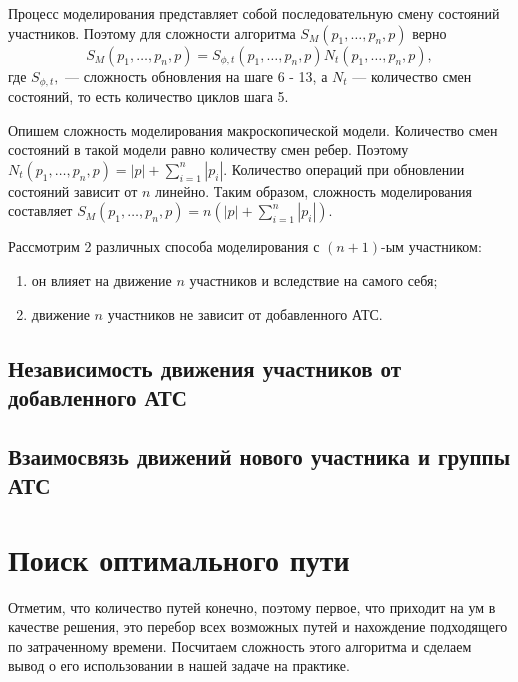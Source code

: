 \documentclass[12pt, a4paper]{article}
\begin{document}
	Процесс моделирования представляет собой последовательную смену состояний участников. Поэтому для сложности алгоритма $S_M (p_1, \ldots, p_n, p)$ верно 
	$$S_M (p_1, \ldots, p_n, p) = S_{\phi, t} (p_1, \ldots, p_n, p) N_{t} (p_1, \ldots, p_n, p),$$ где $S_{\phi, t},$ --- сложность обновления на шаге 6 - 13, а $N_{t}$ --- количество смен состояний, то есть количество циклов шага 5.
	
	Опишем сложность моделирования макроскопической модели. Количество смен состояний в такой модели равно количеству смен ребер. Поэтому $N_{t} (p_1, \ldots, p_n, p) = |p| + \sum\limits_{i = 1}^n|p_i|$. Количество операций при обновлении состояний зависит от $n$ линейно. Таким образом, сложность моделирования составляет $S_M (p_1, \ldots, p_n, p)= n \left(|p| + \sum\limits_{i = 1}^n|p_i|\right)$.
	
	
	Рассмотрим 2 различных способа моделирования с $(n+1)$-ым участником: 
	\begin{enumerate}
		\item он влияет на движение $n$ участников и вследствие на самого себя;
		\item движение $n$ участников не зависит от добавленного АТС.
	\end{enumerate}
	
	\subsection{Независимость движения участников от добавленного АТС}
	\subsection{Взаимосвязь движений нового участника и группы АТС}
	
	\fi
	\newpage
	\section{Поиск оптимального пути}
	
	Отметим, что количество путей конечно, поэтому первое, что приходит на ум в качестве решения, это перебор всех возможных путей и нахождение подходящего по затраченному времени. Посчитаем сложность этого алгоритма и сделаем вывод о его использовании в нашей задаче на практике.
	
\end{document}
